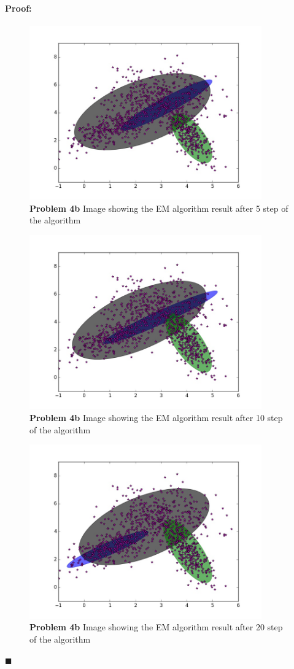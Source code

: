 \documentclass[12pt]{article}
\newenvironment{proof}{\paragraph{Proof: }}{\hfill$\blacksquare$}
\begin{document}
\begin{proof}
\begin{enumerate}
\begin{figure}[!htbp]
\centering
\includegraphics[width = 10cm]{prob4b_5.jpg}
\caption{\textbf{Problem 4b} Image showing the EM algorithm result after 5 step of the algorithm}
\end{figure}

\begin{figure}[!htbp]
\centering
\includegraphics[width = 10cm]{prob4b_10.jpg}
\caption{\textbf{Problem 4b} Image showing the EM algorithm result after 10 step of the algorithm}
\end{figure}

\begin{figure}[!htbp]
\centering
\includegraphics[width = 10cm]{prob4b_20.jpg}
\caption{\textbf{Problem 4b} Image showing the EM algorithm result after 20 step of the algorithm}
\end{figure}


\end{enumerate}
\end{proof}
\end{document}
